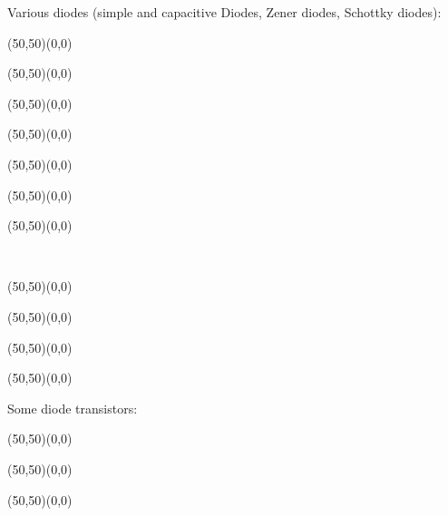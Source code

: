 	
	Various diodes (simple and capacitive Diodes, Zener diodes, Schottky diodes):
	\vspace{0.5cm}
	\begin{center}
	\begin{picture}(50,50)(0,0)
	\end{picture}
	\begin{picture}(50,50)(0,0)
	\end{picture}
	\begin{picture}(50,50)(0,0)
	\end{picture}
	\begin{picture}(50,50)(0,0)
	\end{picture}
	\begin{picture}(50,50)(0,0)
	\end{picture}
	\begin{picture}(50,50)(0,0)
	\end{picture}
	\begin{picture}(50,50)(0,0)
	\end{picture}
	\\[2cm]
	\end{center}
	
	\vspace{0.5cm}
	\begin{center}
	\begin{picture}(50,50)(0,0)
	\end{picture}
	\begin{picture}(50,50)(0,0)
	\end{picture}
	\begin{picture}(50,50)(0,0)
	\end{picture}
	\begin{picture}(50,50)(0,0)
	\end{picture}
	\end{center}
	
	Some diode transistors:
	
	\begin{center}
	\begin{picture}(50,50)(0,0)
	\end{picture}
	\begin{picture}(50,50)(0,0)
	\end{picture}
	\begin{picture}(50,50)(0,0)
	\end{picture}
	\end{center}
	
